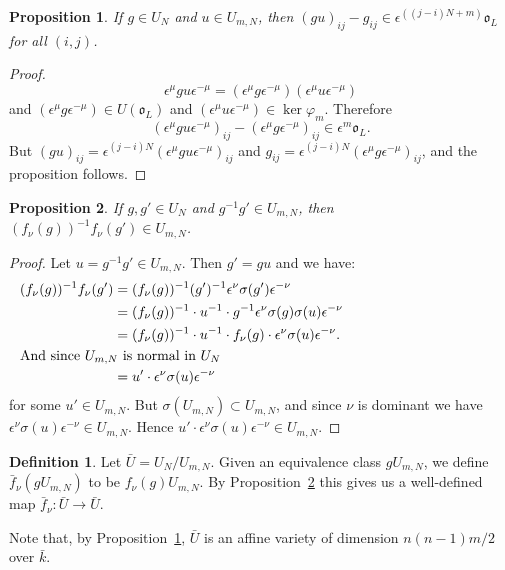 \documentclass{amsart}
\newtheorem{prop}{Proposition}[subsection]
\theoremstyle{definition}
\newtheorem{defn}{Definition}[subsection]
\def\O{\mathfrak{o}}
\def\k{\bar{k}}
\def\e{\epsilon}
\def\s{\sigma}
\def\en{\e^{\nu}}
\def\enm{\e^{-\nu}}
\def\phi{\varphi}
\def\f{f_\nu}
\def\ff{\bar{f}_\nu}
\def\Umn{U_{m,N}}
\def\U{\bar{U}}
\begin{document}
  \begin{prop}
    \label{prop:additive}
    If $g \in U_N$ and $u \in \Umn$, then $(gu)_{ij} - g_{ij} \in
    \e^{((j-i)N+m)}\O_L$ for all $(i, j)$.
  \end{prop}
  \begin{proof}
    \begin{equation*}
      \e^\mu gu \e^{-\mu} = (\e^\mu g \e^{-\mu}) (\e^\mu u \e^{-\mu})
    \end{equation*}
    and $(\e^\mu g \e^{-\mu}) \in U(\O_L)$ and $(\e^\mu u \e^{-\mu}) \in \ker
    \phi_m$.  Therefore 
    \begin{equation*}
      (\e^\mu gu \e^{-\mu})_{ij} - (\e^\mu g \e^{-\mu})_{ij} \in \e^m\O_L.
    \end{equation*}
    But $(gu)_{ij} = \e^{(j-i)N} (\e^\mu gu \e^{-\mu})_{ij}$ and $g_{ij} =
    \e^{(j-i)N} (\e^\mu g \e^{-\mu})_{ij}$, and the proposition follows.
  \end{proof}

  \begin{prop}
    \label{prop:well-def}
    If $g,g' \in U_N$ and $g^{-1}g' \in \Umn$, then $(\f(g))^{-1}\f(g') \in
    \Umn$.
  \end{prop}
  \begin{proof}
    Let $u = g^{-1}g' \in \Umn$.  Then $g' = gu$ and we have:
    \begin{align*}
      (\f(g))^{-1}\f(g') &= (\f(g))^{-1}(g')^{-1}\en\s(g')\enm \\
      &= (\f(g))^{-1} \cdot u^{-1} \cdot g^{-1}\en\s(g)\s(u)\enm \\
      &= (\f(g))^{-1} \cdot u^{-1} \cdot \f(g)\cdot\en\s(u)\enm. \\
      \noalign{\noindent And since $\Umn$ is normal in $U_N$ }
      &= u'\cdot\en\s(u)\enm
    \end{align*}
    for some $u' \in \Umn$.  But $\s(\Umn) \subset \Umn$, and since $\nu$ is
    dominant we have $\en\s(u)\enm \in \Umn$.  Hence $u' \cdot \en\s(u)\enm \in
    \Umn$.
  \end{proof}

  \begin{defn}
    Let $\U = U_N/\Umn$. Given an equivalence class $g\Umn$, we define
    $\ff(g\Umn)$ to be $\f(g)\Umn$.  By Proposition~\ref{prop:well-def} this
    gives us a well-defined map $\ff : \U \to \U$.
  \end{defn}

  Note that, by Proposition~\ref{prop:additive}, $\U$ is an affine variety of
  dimension $n(n-1)m/2$ over $\k$.
\end{document}
